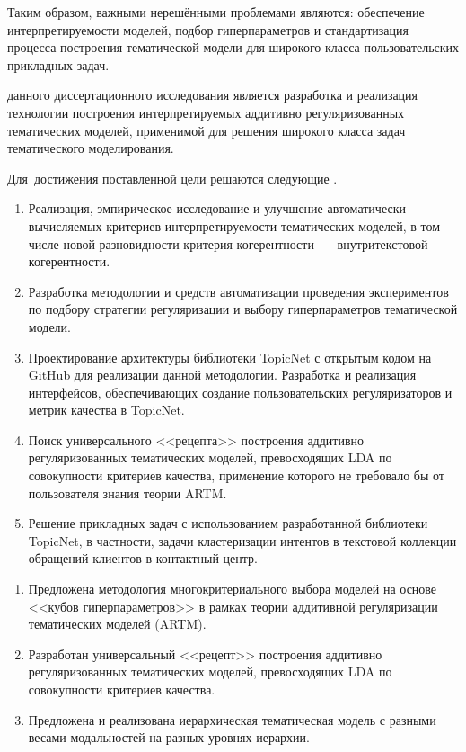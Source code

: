 Таким образом, важными нерешёнными проблемами являются: обеспечение  интерпретируемости моделей, подбор гиперпараметров и стандартизация процесса построения тематической модели для широкого класса пользовательских прикладных задач.

{\aim} данного диссертационного исследования является разработка и реализация технологии построения интерпретируемых аддитивно регуляризованных тематических моделей, применимой для решения широкого класса задач тематического моделирования. 

Для~достижения поставленной цели решаются следующие {\tasks}.
\begin{enumerate}[beginpenalty=10000] %
  \item Реализация, эмпирическое исследование и улучшение автоматически вычисляемых критериев интерпретируемости тематических моделей, в том числе новой разновидности критерия когерентности~--- внутритекстовой когерентности.
  \item Разработка методологии и средств автоматизации проведения экспериментов по подбору стратегии регуляризации и выбору гиперпараметров тематической модели.
  \item Проектирование архитектуры библиотеки TopicNet с открытым кодом на GitHub для реализации данной методологии. Разработка и реализация интерфейсов, обеспечивающих создание пользовательских регуляризаторов и метрик качества в TopicNet.
  \item Поиск универсального <<рецепта>> построения аддитивно регуляризованных тематических моделей, превосходящих LDA по совокупности критериев качества, применение которого не требовало бы от пользователя знания теории ARTM.
  \item Решение прикладных задач с использованием разработанной библиотеки TopicNet, в частности, задачи кластеризации интентов в текстовой коллекции обращений клиентов в контактный центр.
\end{enumerate}

{\novelty}
\begin{enumerate}[beginpenalty=10000] %
  \item Предложена методология многокритериального выбора моделей на основе <<кубов гиперпараметров>> в рамках теории аддитивной регуляризации тематических моделей (ARTM).
  \item Разработан универсальный <<рецепт>> построения аддитивно регуляризованных тематических моделей, превосходящих LDA по совокупности критериев качества.
  \item Предложена и реализована иерархическая тематическая модель с разными весами модальностей на разных уровнях иерархии. 
\end{enumerate}

